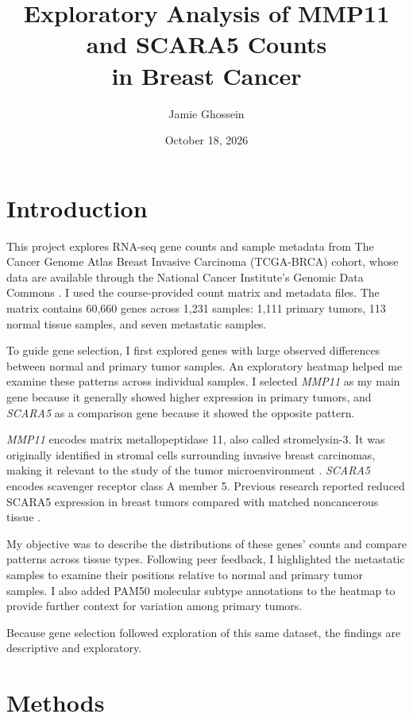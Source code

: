 \documentclass[11pt]{article}
\title{Exploratory Analysis of MMP11 and SCARA5 Counts\\
in Breast Cancer}
\author{Jamie Ghossein}
\date{October 18, 2026}
\begin{document}
\maketitle

\section{Introduction}

This project explores RNA-seq gene counts and sample metadata
from The Cancer Genome Atlas Breast Invasive Carcinoma
(TCGA-BRCA) cohort, whose data are available through the
National Cancer Institute's Genomic Data Commons
\cite{gdc}. I used the course-provided count matrix and
metadata files. The matrix contains 60,660 genes across
1,231 samples: 1,111 primary tumors, 113 normal tissue
samples, and seven metastatic samples.

To guide gene selection, I first explored genes with large
observed differences between normal and primary tumor
samples. An exploratory heatmap helped me examine these
patterns across individual samples. I selected
\textit{MMP11} as my main gene because it generally showed
higher expression in primary tumors, and \textit{SCARA5}
as a comparison gene because it showed the opposite pattern.

\textit{MMP11} encodes matrix metallopeptidase 11, also called
stromelysin-3. It was originally identified in stromal cells
surrounding invasive breast carcinomas, making it relevant
to the study of the tumor microenvironment \cite{basset1990}.
\textit{SCARA5} encodes scavenger receptor class A member 5.
Previous research reported reduced SCARA5 expression in
breast tumors compared with matched noncancerous tissue
\cite{ulker2018}.

My objective was to describe the distributions of these
genes' counts and compare patterns across tissue types.
Following peer feedback, I highlighted the metastatic
samples to examine their positions relative to normal
and primary tumor samples. I also added PAM50 molecular
subtype annotations to the heatmap to provide further
context for variation among primary tumors.

Because gene selection followed exploration of this same
dataset, the findings are descriptive and exploratory.


\section{Methods}
\end{document}

